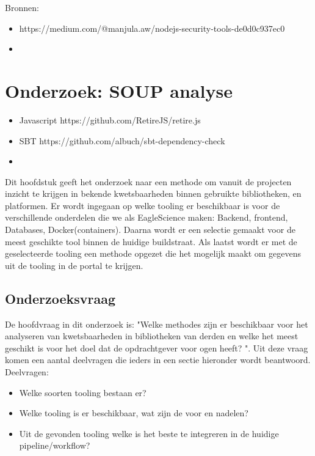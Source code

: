 
Bronnen:

\begin{itemize}
    \item https://medium.com/@manjula.aw/nodejs-security-tools-de0d0c937ec0
    \item
\end{itemize}



\chapter{Onderzoek: SOUP analyse}\label{ch:onderzoek:-soup-analyse} %
\begin{itemize}
    \item Javascript     https://github.com/RetireJS/retire.js
    \item SBT https://github.com/albuch/sbt-dependency-check
    \item
\end{itemize}

Dit hoofdstuk geeft het onderzoek naar een methode om vanuit de projecten inzicht te krijgen in bekende kwetsbaarheden binnen gebruikte bibliotheken, en platformen. Er wordt ingegaan op welke tooling er beschikbaar is voor de verschillende onderdelen die we als EagleScience maken: Backend, frontend, Databases, Docker(containers). Daarna wordt er een selectie gemaakt voor de meest geschikte tool binnen de huidige buildstraat. Als laatst wordt er met de geselecteerde tooling een methode opgezet die het mogelijk maakt om gegevens uit de tooling in de portal te krijgen.

\section{Onderzoeksvraag}\label{sec:onderzoeksvraag}
De hoofdvraag in dit onderzoek is:  "Welke methodes zijn er beschikbaar voor het analyseren van kwetsbaarheden in bibliotheken van derden en welke het meest geschikt is voor het doel dat de opdrachtgever voor ogen heeft? ". Uit deze vraag komen een aantal deelvragen die ieders in een sectie hieronder wordt beantwoord.
Deelvragen:
\smallskip
\begin{itemize}

    \item Welke soorten tooling bestaan er?
    \item Welke tooling is er beschikbaar, wat zijn de voor en nadelen?
    \item Uit de gevonden tooling welke is het beste te integreren in de huidige pipeline/workflow?

\end{itemize}

